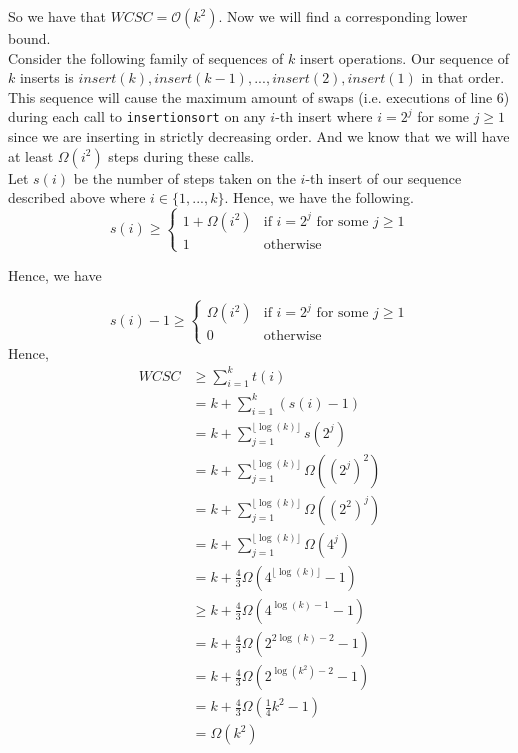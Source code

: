 \documentclass[12pt]{article}
\begin{document}
So we have that $WCSC = \mathcal{O}(k^2)$. Now we will find a corresponding lower bound. \\

Consider the following family of sequences of $k$ insert operations. Our sequence of $k$ inserts is $insert(k),insert(k-1),...,insert(2),insert(1)$ in that order. This sequence will cause the maximum amount of swaps (i.e. executions of line 6) during each call to \verb|insertionsort| on any $i$-th insert where $i = 2^j$ for some $j \geq 1$ since we are inserting in strictly decreasing order. And we know that we will have at least $\Omega(i^2)$ steps during these calls. \\
 
Let $s(i)$ be the number of steps taken on the $i$-th insert of our sequence described above where $i \in \{1,...,k\}$. Hence, we have the following.
\[
    s(i) \geq 
    \begin{cases} 
        1 + \Omega(i^2) &\text{if $i = 2^j$ for some $j \geq 1$} \\
        1 &\text{otherwise}
    \end{cases}
\]

Hence, we have

\[
    s(i) - 1 \geq 
    \begin{cases} 
        \Omega(i^2) &\text{if $i = 2^j$ for some $j \geq 1$} \\
        0 &\text{otherwise}
    \end{cases}
\]
Hence,
\begin{align*}
WCSC &\geq \sum_{i=1}^k t(i) \\
&= k + \sum_{i=1}^k (s(i) - 1) \\
&= k + \sum_{j=1}^{\lfloor \log(k) \rfloor} s(2^j) \\
&= k + \sum_{j=1}^{\lfloor \log(k) \rfloor} \Omega((2^j)^2) \\
&= k + \sum_{j=1}^{\lfloor \log(k) \rfloor} \Omega((2^2)^j) \\
&= k + \sum_{j=1}^{\lfloor \log(k) \rfloor} \Omega(4^j) \\
&= k + \frac{4}{3}\Omega(4^{\lfloor \log(k) \rfloor}-1) \\
&\geq k + \frac{4}{3}\Omega(4^{\log(k) - 1}-1) \\
&= k + \frac{4}{3}\Omega(2^{2\log(k) - 2}-1) \\
&= k + \frac{4}{3}\Omega(2^{\log(k^2) - 2}-1) \\
&= k + \frac{4}{3}\Omega(\frac{1}{4}k^2-1) \\
&= \Omega(k^2)
\end{align*}
\end{document}
